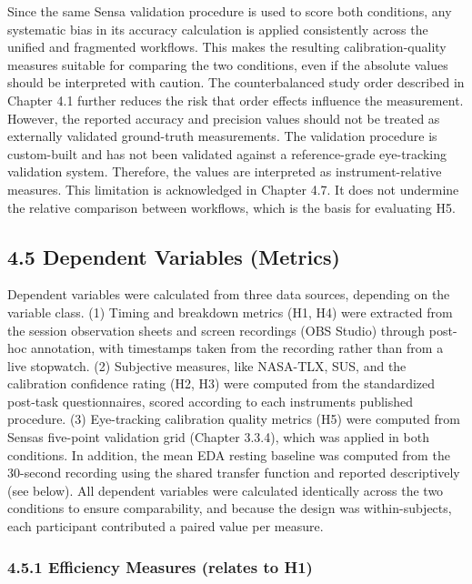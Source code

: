 \documentclass[
]{article}
\begin{document}
Since the same Sensa validation procedure is used to score both conditions, any systematic bias in its accuracy calculation is applied consistently across the unified and fragmented workflows. This makes the resulting calibration-quality measures suitable for comparing the two conditions, even if the absolute values should be interpreted with caution. The counterbalanced study order described in Chapter 4.1 further reduces the risk that order effects influence the measurement. However, the reported accuracy and precision values should not be treated as externally validated ground-truth measurements. The validation procedure is custom-built and has not been validated against a reference-grade eye-tracking validation system. Therefore, the values are interpreted as instrument-relative measures. This limitation is acknowledged in Chapter 4.7. It does not undermine the relative comparison between workflows, which is the basis for evaluating H5.

\hypertarget{dependent-variables-metrics}{%
\subsection{4.5 Dependent Variables (Metrics)}\label{dependent-variables-metrics}}

Dependent variables were calculated from three data sources, depending on the variable class. (1) Timing and breakdown metrics (H1, H4) were extracted from the session observation sheets and screen recordings (OBS Studio) through post-hoc annotation, with timestamps taken from the recording rather than from a live stopwatch. (2) Subjective measures, like NASA-TLX, SUS, and the calibration confidence rating (H2, H3) were computed from the standardized post-task questionnaires, scored according to each instrument\textquotesingle s published procedure. (3) Eye-tracking calibration quality metrics (H5) were computed from Sensa\textquotesingle s five-point validation grid (Chapter 3.3.4), which was applied in both conditions. In addition, the mean EDA resting baseline was computed from the 30-second recording using the shared transfer function and reported descriptively (see below). All dependent variables were calculated identically across the two conditions to ensure comparability, and because the design was within-subjects, each participant contributed a paired value per measure.

\hypertarget{efficiency-measures-relates-to-h1}{%
\subsubsection{4.5.1 Efficiency Measures (relates to H1)}\label{efficiency-measures-relates-to-h1}}
\end{document}
